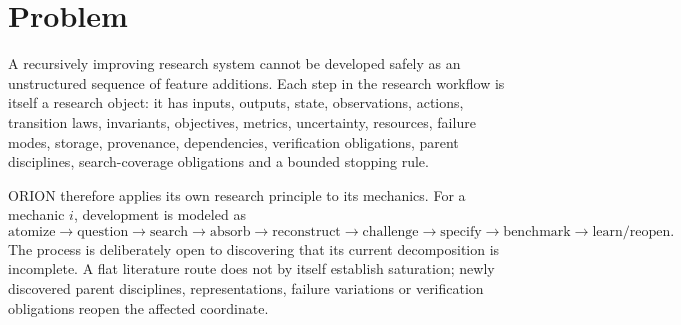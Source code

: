 \section{Problem}
A recursively improving research system cannot be developed safely as an unstructured sequence of feature additions.  Each step in the research workflow is itself a research object: it has inputs, outputs, state, observations, actions, transition laws, invariants, objectives, metrics, uncertainty, resources, failure modes, storage, provenance, dependencies, verification obligations, parent disciplines, search-coverage obligations and a bounded stopping rule.

ORION therefore applies its own research principle to its mechanics.  For a mechanic $i$, development is modeled as
\[
\text{atomize}\to\text{question}\to\text{search}\to\text{absorb}\to\text{reconstruct}\to\text{challenge}\to\text{specify}\to\text{benchmark}\to\text{learn/reopen}.
\]
The process is deliberately open to discovering that its current decomposition is incomplete.  A flat literature route does not by itself establish saturation; newly discovered parent disciplines, representations, failure variations or verification obligations reopen the affected coordinate.
